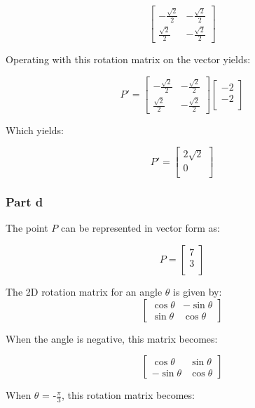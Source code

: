 \documentclass{article}
\begin{document}
\[
\begin{bmatrix}
-\frac{\sqrt{2}}{2} & -\frac{\sqrt{2}}{2} \\
\frac{\sqrt{2}}{2} & -\frac{\sqrt{2}}{2}
\end{bmatrix}
\]

Operating with this rotation matrix on the vector yields:


\[P ' =
\begin{bmatrix}
-\frac{\sqrt{2}}{2} & -\frac{\sqrt{2}}{2} \\
\frac{\sqrt{2}}{2} & -\frac{\sqrt{2}}{2}
\end{bmatrix}
\left[ {\begin{array}{c}
    -2 \\
    -2 \\
  \end{array} } \right]
\]

Which yields:

\[
  P'= 
  \left[ {\begin{array}{c}
    2 \sqrt{2} \\
    0 \\
  \end{array} } \right]
\]

\subsubsection*{Part d}

The point $P$ can be represented in vector form as: 

\[
  P= 
  \left[ {\begin{array}{c}
    7 \\
    3 \\
  \end{array} } \right]
\]

The 2D rotation matrix for an angle $\theta$ is given by:
\[
\begin{bmatrix}
\cos \theta & -\sin \theta \\
\sin \theta & \cos \theta
\end{bmatrix}
\]

When the angle is negative, this matrix becomes:

\[
\begin{bmatrix}
\cos \theta & \sin \theta \\
-\sin \theta & \cos \theta
\end{bmatrix}
\]



When $\theta$ = -$\frac{\pi}{3}$, this rotation matrix becomes:
\end{document}
